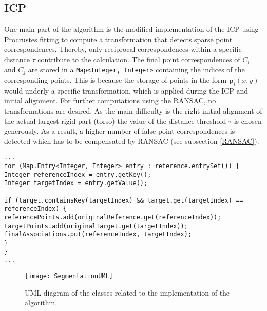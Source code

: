 
\subsection{ICP}
One main part of the algorithm is the modified implementation of the ICP using Procrustes fitting to compute a transformation that detects sparse point correspondences. Thereby, only reciprocal correspondences within a specific distance $\tau$ contribute to the calculation. The final point correspondences of $C_i$ and $C_j$ are stored in a \texttt{Map<Integer, Integer>} containing the indices of the corresponding points. This is because the storage of points in the form $\boldsymbol{p}_i(x,y)$ would underly a specific transformation, which is applied during the ICP and initial alignment. For further computations using the RANSAC, no transformations are desired. As the main difficulty is the right initial alignment of the actual largest rigid part (torso) the value of the distance threshold $\tau$ is chosen generously. As a result, a higher number of false point correspondences is detected which has to be compensated by RANSAC (see subsection \ref{RANSAC}).

\begin{lstlisting}
...
for (Map.Entry<Integer, Integer> entry : reference.entrySet()) {
Integer referenceIndex = entry.getKey();
Integer targetIndex = entry.getValue();

if (target.containsKey(targetIndex) && target.get(targetIndex) == referenceIndex) {
referencePoints.add(originalReference.get(referenceIndex));
targetPoints.add(originalTarget.get(targetIndex));
finalAssociations.put(referenceIndex, targetIndex);
}
}
...
\end{lstlisting}

\begin{figure}
	\centering
	\texttt{[image: SegmentationUML]}
	\caption{UML diagram of the classes related to the implementation of the algorithm.}
	\label{fig:UML}
\end{figure}


